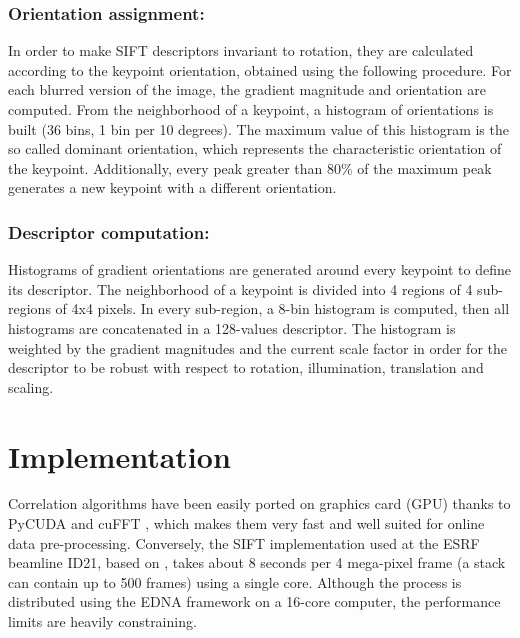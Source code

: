 \documentclass[preprint]{iucr}
\begin{document}
\subsubsection{Orientation assignment:}
In order to make SIFT descriptors invariant to rotation, they are calculated
according to the keypoint orientation,
obtained using the following procedure.
For each blurred version of the image, the gradient magnitude and orientation
are computed.
From the neighborhood of a keypoint, a histogram of orientations is built (36
bins, 1 bin per 10 degrees).
The maximum value of this histogram is the so called dominant orientation, which
represents the characteristic orientation of the keypoint.
Additionally, every peak greater than 80\% of the maximum peak generates a new
keypoint with a different orientation.


\subsubsection{Descriptor computation:}
Histograms of gradient orientations are generated around every keypoint to
define its descriptor.
The neighborhood of a keypoint is divided into 4 regions of 4 sub-regions of 4x4
pixels.
In every sub-region, a 8-bin histogram is computed, then all histograms
are concatenated in a 128-values descriptor.
The histogram is weighted by the gradient magnitudes and the current scale
factor in order for the descriptor to be robust with respect to rotation,
illumination, translation and scaling.


\section{Implementation}

Correlation algorithms have been easily ported on
graphics card (GPU) thanks to PyCUDA \cite{pyopencl} and cuFFT \cite{cufft},
which makes them very fast and well suited for online data pre-processing.
Conversely, the SIFT
implementation used at the ESRF beamline ID21, based on \cite{ASIFT}, takes
about 8 seconds per 4 mega-pixel frame  (a stack can contain up to  500 frames) using a
single core.
Although the process is distributed using the EDNA framework \cite{edna} on a
16-core computer, the performance limits are heavily constraining.
\end{document}
